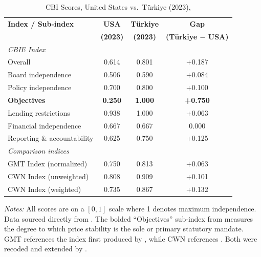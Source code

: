 \documentclass[12pt,a4paper]{article}
\begin{document}
\begin{doublespace}
\begin{singlespace}
\begin{table}[H]
\centering
\caption{CBI Scores, United States vs.\ T\"urkiye (2023), \textcite{romelli_trends_2024} }
\label{tab:romelli_cbi}
\begin{tabular}{lccc}
\toprule
\textbf{Index / Sub-index} & \textbf{USA} & \textbf{T\"urkiye} & \textbf{Gap} \\
 & \textbf{(2023)} & \textbf{(2023)} & \textbf{(T\"urkiye $-$ USA)} \\
\midrule
\multicolumn{4}{l}{\textit{CBIE Index}} \\
\quad Overall & 0.614 & 0.801 & +0.187 \\
\quad Board independence & 0.506 & 0.590 & +0.084 \\
\quad Policy independence & 0.700 & 0.800 & +0.100 \\
\quad \textbf{Objectives} & \textbf{0.250} & \textbf{1.000} & \textbf{+0.750} \\
\quad Lending restrictions & 0.938 & 1.000 & +0.063 \\
\quad Financial independence & 0.667 & 0.667 & \phantom{+}0.000 \\
\quad Reporting \& accountability & 0.625 & 0.750 & +0.125 \\
\midrule
\multicolumn{4}{l}{\textit{Comparison indices}} \\
\quad GMT Index (normalized) & 0.750 & 0.813 & +0.063 \\
\quad CWN Index (unweighted) & 0.808 & 0.909 & +0.101 \\
\quad CWN Index (weighted) & 0.735 & 0.867 & +0.132 \\
\bottomrule
\end{tabular}
\smallskip
\begin{minipage}{\linewidth}
\footnotesize\textit{Notes:} All scores are on a $[0,1]$ scale where 1 denotes maximum independence. Data sourced directly from \textcite{romelli_trends_2024}. The bolded ``Objectives'' sub-index from \textcite{romelli_trends_2024} measures the degree to which price stability is the sole or primary statutory mandate. GMT references the index first produced by \textcite{grilli_political_1991}, while CWN references \textcite{cukierman_measuring_1992}. Both were recoded and extended by \textcite{romelli_trends_2024}.
\end{minipage}
\end{table}
\end{singlespace}


\end{doublespace}
\end{document}
